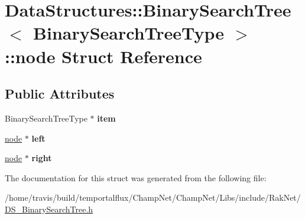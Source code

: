 \hypertarget{struct_data_structures_1_1_binary_search_tree_1_1node}{\section{Data\-Structures\-:\-:Binary\-Search\-Tree$<$ Binary\-Search\-Tree\-Type $>$\-:\-:node Struct Reference}
\label{struct_data_structures_1_1_binary_search_tree_1_1node}
}
\subsection*{Public Attributes}
\begin{DoxyCompactItemize}
\item 
\hypertarget{struct_data_structures_1_1_binary_search_tree_1_1node_aae201835a5764223f821b246ebd3f700}{Binary\-Search\-Tree\-Type $\ast$ {\bfseries item}}\label{struct_data_structures_1_1_binary_search_tree_1_1node_aae201835a5764223f821b246ebd3f700}

\item 
\hypertarget{struct_data_structures_1_1_binary_search_tree_1_1node_ac4f290c3a0db3cbeb593c0fc4e825efc}{\hyperlink{struct_data_structures_1_1_binary_search_tree_1_1node}{node} $\ast$ {\bfseries left}}\label{struct_data_structures_1_1_binary_search_tree_1_1node_ac4f290c3a0db3cbeb593c0fc4e825efc}

\item 
\hypertarget{struct_data_structures_1_1_binary_search_tree_1_1node_a081b81949db193622d3ec9811c1fbaf9}{\hyperlink{struct_data_structures_1_1_binary_search_tree_1_1node}{node} $\ast$ {\bfseries right}}\label{struct_data_structures_1_1_binary_search_tree_1_1node_a081b81949db193622d3ec9811c1fbaf9}

\end{DoxyCompactItemize}


The documentation for this struct was generated from the following file\-:\begin{DoxyCompactItemize}
\item 
/home/travis/build/temportalflux/\-Champ\-Net/\-Champ\-Net/\-Libs/include/\-Rak\-Net/\hyperlink{_d_s___binary_search_tree_8h}{D\-S\-\_\-\-Binary\-Search\-Tree.\-h}\end{DoxyCompactItemize}

